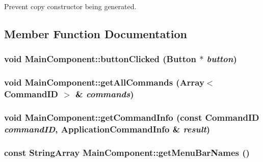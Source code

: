 \begin{CompactItemize}
Prevent copy constructor being generated. 



\subsection{Member Function Documentation}
\hypertarget{class_main_component_30edcb9bd53a38eb4268689b3323828b}{
\subsubsection[{buttonClicked}]{\setlength{\rightskip}{0pt plus 5cm}void MainComponent::buttonClicked (Button $\ast$ {\em button})}}
\label{class_main_component_30edcb9bd53a38eb4268689b3323828b}


\hypertarget{class_main_component_1688430c1a50a254245f2607eaad1e04}{
\subsubsection[{getAllCommands}]{\setlength{\rightskip}{0pt plus 5cm}void MainComponent::getAllCommands (Array$<$ CommandID $>$ \& {\em commands})}}
\label{class_main_component_1688430c1a50a254245f2607eaad1e04}


\hypertarget{class_main_component_9fe9c493192ad557a820d6077065b05c}{
\subsubsection[{getCommandInfo}]{\setlength{\rightskip}{0pt plus 5cm}void MainComponent::getCommandInfo (const CommandID {\em commandID}, \/  ApplicationCommandInfo \& {\em result})}}
\label{class_main_component_9fe9c493192ad557a820d6077065b05c}


\hypertarget{class_main_component_c17ad22bd3512871f0cb44462551e3d2}{
\subsubsection[{getMenuBarNames}]{\setlength{\rightskip}{0pt plus 5cm}const StringArray MainComponent::getMenuBarNames ()}}
\label{class_main_component_c17ad22bd3512871f0cb44462551e3d2}



\end{CompactItemize}
